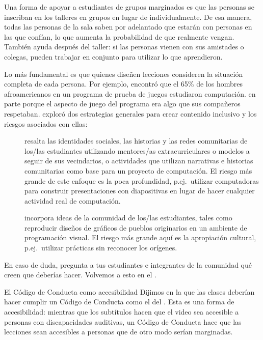 Una forma de apoyar a estudiantes de grupos marginados es
que las personas se inscriban en los talleres en grupos en lugar de individualmente.
De esa manera,
todas las personas de la sala saben por adelantado que estarán con personas en las que confían,
lo que aumenta la probabilidad de que realmente vengan.
También ayuda después del taller:
si las personas vienen con sus amistades o colegas,
pueden trabajar en conjunto para utilizar lo que aprendieron.

Lo más fundamental es que quienes diseñen lecciones
consideren la situación completa de cada persona.
Por ejemplo,
\cite{DiSa2014a} encontró que el 65\% de los hombres afroamericanos en un programa de prueba de juegos estudiaron computación.
en parte porque el aspecto de juego del programa era algo que sus compañeros respetaban.
\cite{Lach2018} exploró dos estrategias generales para crear contenido inclusivo y los riesgos asociados con ellas:

\begin{description}

\item[{}]
  resalta las identidades sociales, las historias y las redes comunitarias de los/las estudiantes
  utilizando mentores/as extracurriculares o modelos a seguir de sus vecindarios,
  o actividades que utilizan narrativas e historias comunitarias
  como base para un proyecto de computación.
  El riesgo más grande de este enfoque es la poca profundidad,
  p.ej.\ utilizar computadoras para construir presentaciones con diapositivas en lugar de hacer cualquier actividad real de computación.

\item[{}]
  incorpora ideas de la comunidad de los/las estudiantes,
  tales como reproducir diseños de gráficos de pueblos originarios en un ambiente de programación visual.
  El riesgo más grande aquí es la apropiación cultural,
  p.ej.\ utilizar prácticas sin reconocer los orígenes.

\end{description}

En caso de duda,
pregunta a tus estudiantes e integrantes de la comunidad qué creen que deberías hacer.
Volvemos a esto en el .

\begin{aside}{El Código de Conducta como accesibilidad}
  Dijimos en la  que las clases deberían hacer cumplir un Código de Conducta como el del .
  Esta es una forma de accesibilidad:
  mientras que los subtítulos hacen que el video sea accesible a personas con discapacidades auditivas,
  un Código de Conducta hace que las lecciones sean accesibles a personas que de otro modo serían marginadas.
\end{aside}

